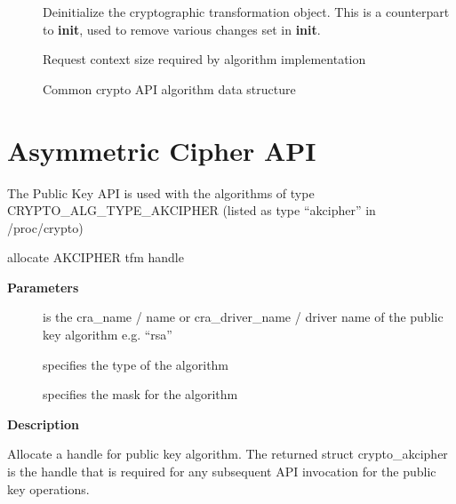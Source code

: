 \documentclass[a4paper,8pt,english]{sphinxmanual}
\begin{document}
\begin{description}
\item[{}] \leavevmode
Deinitialize the cryptographic transformation object. This is a
counterpart to \textbf{init}, used to remove various changes set in
\textbf{init}.

\item[{}] \leavevmode
Request context size required by algorithm implementation

\item[{}] \leavevmode
Common crypto API algorithm data structure

\end{description}


\section{Asymmetric Cipher API}
\label{crypto/api-akcipher:asymmetric-cipher-api}
The Public Key API is used with the algorithms of type
CRYPTO\_ALG\_TYPE\_AKCIPHER (listed as type ``akcipher'' in /proc/crypto)

\begin{fulllineitems}
\label{crypto/api-akcipher:c.crypto_alloc_akcipher}
allocate AKCIPHER tfm handle

\end{fulllineitems}


\textbf{Parameters}
\begin{description}
\item[{}] \leavevmode
is the cra\_name / name or cra\_driver\_name / driver name of the
public key algorithm e.g. ``rsa''

\item[{}] \leavevmode
specifies the type of the algorithm

\item[{}] \leavevmode
specifies the mask for the algorithm

\end{description}

\textbf{Description}

Allocate a handle for public key algorithm. The returned struct
crypto\_akcipher is the handle that is required for any subsequent
API invocation for the public key operations.
\end{document}
